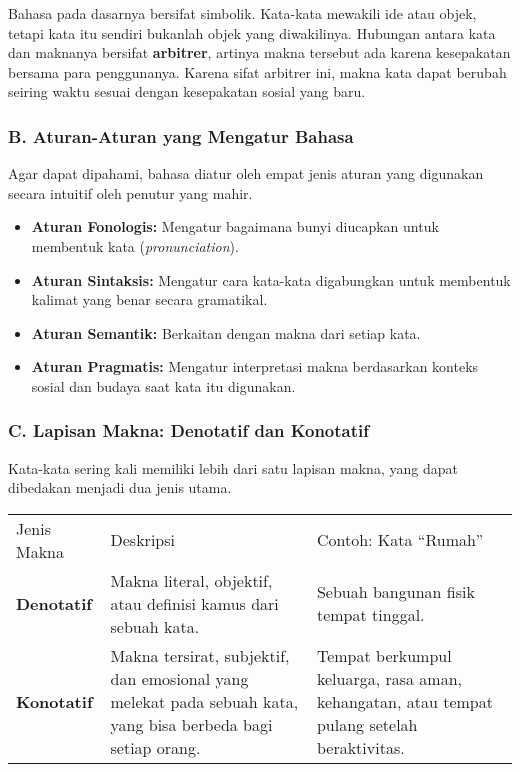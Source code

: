 \documentclass[
  letterpaper,
  DIV=11,
  numbers=noendperiod]{scrreprt}
\begin{document}
Bahasa pada dasarnya bersifat simbolik. Kata-kata mewakili ide atau
objek, tetapi kata itu sendiri bukanlah objek yang diwakilinya. Hubungan
antara kata dan maknanya bersifat \textbf{arbitrer}, artinya makna
tersebut ada karena kesepakatan bersama para penggunanya. Karena sifat
arbitrer ini, makna kata dapat berubah seiring waktu sesuai dengan
kesepakatan sosial yang baru.

\subsubsection{B. Aturan-Aturan yang Mengatur
Bahasa}\label{b.-aturan-aturan-yang-mengatur-bahasa}

Agar dapat dipahami, bahasa diatur oleh empat jenis aturan yang
digunakan secara intuitif oleh penutur yang mahir.

\begin{itemize}
\item
  \textbf{Aturan Fonologis:} Mengatur bagaimana bunyi diucapkan untuk
  membentuk kata (\emph{pronunciation}).
\item
  \textbf{Aturan Sintaksis:} Mengatur cara kata-kata digabungkan untuk
  membentuk kalimat yang benar secara gramatikal.
\item
  \textbf{Aturan Semantik:} Berkaitan dengan makna dari setiap kata.
\item
  \textbf{Aturan Pragmatis:} Mengatur interpretasi makna berdasarkan
  konteks sosial dan budaya saat kata itu digunakan.
\end{itemize}

\subsubsection{C. Lapisan Makna: Denotatif dan
Konotatif}\label{c.-lapisan-makna-denotatif-dan-konotatif}

Kata-kata sering kali memiliki lebih dari satu lapisan makna, yang dapat
dibedakan menjadi dua jenis utama.

\begin{longtable}[]{@{}
  >{\raggedright\arraybackslash}p{}
  >{\raggedright\arraybackslash}p{}
  >{\raggedright\arraybackslash}p{}@{}}
\toprule\noalign{}
\endhead
\bottomrule\noalign{}
\endlastfoot
Jenis Makna & Deskripsi & Contoh: Kata ``Rumah'' \\
\textbf{Denotatif} & Makna literal, objektif, atau definisi kamus dari
sebuah kata. & Sebuah bangunan fisik tempat tinggal. \\
\textbf{Konotatif} & Makna tersirat, subjektif, dan emosional yang
melekat pada sebuah kata, yang bisa berbeda bagi setiap orang. & Tempat
berkumpul keluarga, rasa aman, kehangatan, atau tempat pulang setelah
beraktivitas. \\
\end{longtable}
\end{document}
